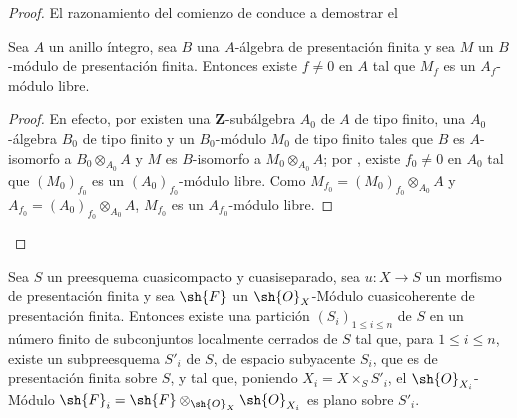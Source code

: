 \begin{proof}
El razonamiento del comienzo de  conduce a demostrar el

\begin{lemma}[8.9.4.1]
\label{IV.8.9.4.1}
Sea $A$ un anillo íntegro, sea $B$ una $A$-álgebra de presentación finita y sea $M$ un $B$-módulo de presentación finita.
Entonces existe $f\neq 0$ en $A$ tal que $M_f$ es un $A_f$-módulo libre.
\end{lemma}

\begin{proof}
En efecto, por  existen una $\mathbf{Z}$-subálgebra $A_0$ de $A$ de tipo finito, una $A_0$-álgebra $B_0$ de tipo finito y un $B_0$-módulo $M_0$ de tipo finito tales que $B$ es $A$-isomorfo a $B_0\otimes_{A_0}A$ y $M$ es $B$-isomorfo a $M_0\otimes_{A_0}A$; por , existe $f_0\neq 0$ en $A_0$ tal que $(M_0)_{f_0}$ es un $(A_0)_{f_0}$-módulo libre.
Como $M_{f_0}=(M_0)_{f_0}\otimes_{A_0}A$ y $A_{f_0}=(A_0)_{f_0}\otimes_{A_0}A$, $M_{f_0}$ es un $A_{f_0}$-módulo libre.
\end{proof}
\end{proof}

\begin{corollary}[8.9.5]
\label{IV.8.9.5}
Sea $S$ un preesquema cuasicompacto y cuasiseparado, sea $u:X\to S$ un morfismo de presentación finita y sea $\sh{F}$ un $\sh{O}_X$-Módulo cuasicoherente de presentación finita.
Entonces existe una partición $(S_i)_{1\leqslant i\leqslant n}$ de $S$ en un número finito de subconjuntos localmente cerrados de $S$ tal que, para $1\leqslant i\leqslant n$, existe un subpreesquema $S'_i$ de $S$, de espacio subyacente $S_i$, que es de presentación finita sobre $S$, y tal que, poniendo $X_i=X\times_S S'_i$, el $\sh{O}_{X_i}$-Módulo $\sh{F}_i=\sh{F}\otimes_{\sh{O}_X}\sh{O}_{X_i}$ es plano sobre $S'_i$.
\end{corollary}

